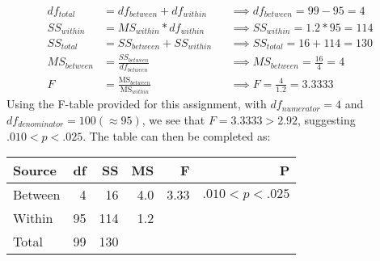 \documentclass[onecolumn,10pt]{jhwhw}
\begin{document}
\begin{align*}
df_{total} &= df_{between} + df_{within} && \implies df_{between} = 99-95 = 4\\
SS_{within} &= MS_{within} * df_{within} && \implies SS_{within} = 1.2 * 95 = 114\\
SS_{total} &= SS_{between} + SS_{within} && \implies SS_{total} = 16 + 114 = 130\\
MS_{between} &= \frac{SS_{between}}{df_{between}} && \implies MS_{between} = \frac{16}{4} = 4 \\
F &= \frac{\mbox{MS}_{between}}{\mbox{MS}_{within}} && \implies F = \frac{4}{1.2} = 3.3333
\end{align*}
Using the F-table provided for this assignment, with $df_{numerator} = 4$ and $df_{denominator} = 100 (\approx 95)$, we see that $F = 3.3333 > 2.92$, suggesting $.010 < p < .025$. The table can then be completed as:

\begin{center}
\begin{tabular}{l r r r r r}
\toprule
Source & df & SS & MS & F & P \\
\midrule
Between &  4 &  16 & 4.0 & 3.33 & $.010 < p < .025$ \\
Within  & 95 & 114 & 1.2 & & \\
Total   & 99 & 130 &     & & \\
\bottomrule
\end{tabular}
\end{center}
\end{document}
